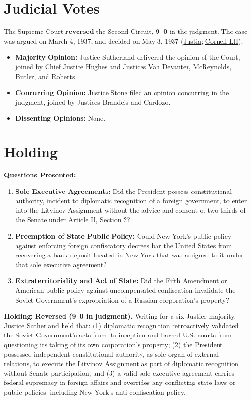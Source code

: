 \documentclass[12pt]{article}
\begin{document}
\section{Judicial Votes}
The Supreme Court \textbf{reversed} the Second Circuit, \textbf{9--0} in the judgment. The case was argued on March 4, 1937, and decided on May 3, 1937 (\href{https://supreme.justia.com/cases/federal/us/301/324/}{Justia}; \href{https://www.law.cornell.edu/supremecourt/text/301/324}{Cornell LII}):

\begin{itemize}
    \item \textbf{Majority Opinion:} Justice Sutherland delivered the opinion of the Court, joined by Chief Justice Hughes and Justices Van Devanter, McReynolds, Butler, and Roberts.
    \item \textbf{Concurring Opinion:} Justice Stone filed an opinion concurring in the judgment, joined by Justices Brandeis and Cardozo.
    \item \textbf{Dissenting Opinions:} None.
\end{itemize}

\section{Holding}
\textbf{Questions Presented:}

\begin{enumerate}
  \item \textbf{Sole Executive Agreements:} Did the President possess constitutional authority, incident to diplomatic recognition of a foreign government, to enter into the Litvinov Assignment without the advice and consent of two-thirds of the Senate under Article II, Section 2?
  \item \textbf{Preemption of State Public Policy:} Could New York's public policy against enforcing foreign confiscatory decrees bar the United States from recovering a bank deposit located in New York that was assigned to it under that sole executive agreement?
  \item \textbf{Extraterritoriality and Act of State:} Did the Fifth Amendment or American public policy against uncompensated confiscation invalidate the Soviet Government's expropriation of a Russian corporation's property?
\end{enumerate}

\textbf{Holding:} \textbf{Reversed (9--0 in judgment).} Writing for a six-Justice majority, Justice Sutherland held that: (1) diplomatic recognition retroactively validated the Soviet Government's acts from its inception and barred U.S. courts from questioning its taking of its own corporation's property; (2) the President possessed independent constitutional authority, as sole organ of external relations, to execute the Litvinov Assignment as part of diplomatic recognition without Senate participation; and (3) a valid sole executive agreement carries federal supremacy in foreign affairs and overrides any conflicting state laws or public policies, including New York's anti-confiscation policy.
\end{document}
